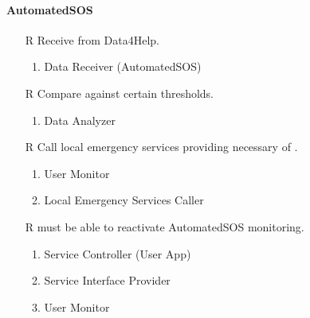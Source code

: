 \paragraph{AutomatedSOS}
\begin{itemize}
	\item[R\subs{36}]Receive  from Data4Help.
	\begin{enumerate}
		\item Data Receiver (AutomatedSOS)
	\end{enumerate}
	\item[R\subs{37}]Compare  against certain thresholds.
	\begin{enumerate}
		\item Data Analyzer
	\end{enumerate}
	\item[R\subs{38}]Call local emergency services providing necessary  of .
	\begin{enumerate}
		\item User Monitor
		\item Local Emergency Services Caller
	\end{enumerate}
	\item[R\subs{39}] must be able to reactivate AutomatedSOS monitoring.
	\begin{enumerate}
		\item Service Controller (User App)
		\item Service Interface Provider
		\item User Monitor
	\end{enumerate}
\end{itemize}


